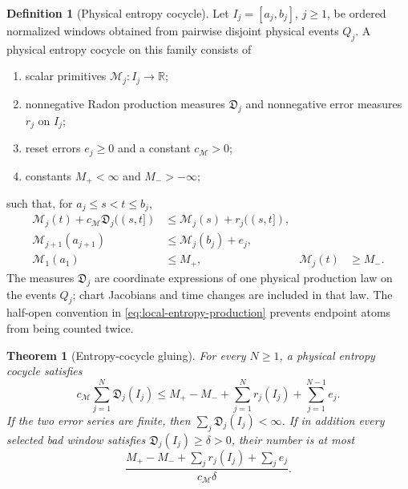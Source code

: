 \documentclass[11pt]{article}
\numberwithin{section}{part}
\theoremstyle{plain}
\newtheorem{theorem}{Theorem}[section]
\theoremstyle{definition}
\newtheorem{definition}[definition]{Definition}
\theoremstyle{remark}
\newcommand{\Production}{\mathfrak D}
\newcommand{\Entropy}{\mathcal M}
\begin{document}
\begin{definition}[Physical entropy cocycle]
\label{def:physical-entropy-cocycle}
Let \(I_j=[a_j,b_j]\), \(j\ge1\), be ordered normalized windows obtained from
pairwise disjoint physical events \(Q_j\).  A physical entropy cocycle on
this family consists of
\begin{enumerate}[label=\textup{(E\arabic*)}]
\item scalar primitives \(\Entropy_j:I_j\to\mathbb R\);
\item nonnegative Radon production measures \(\Production_j\) and
  nonnegative error measures \(r_j\) on \(I_j\);
\item reset errors \(e_j\ge0\) and a constant \(c_{\Entropy}>0\);
\item constants \(M_+<\infty\) and \(M_->-\infty\);
\end{enumerate}
such that, for \(a_j\le s<t\le b_j\),
\begin{align}
 \Entropy_j(t)+c_{\Entropy}\Production_j((s,t])
 &\le \Entropy_j(s)+r_j((s,t]),
 \label{eq:local-entropy-production}\\
 \Entropy_{j+1}(a_{j+1})
 &\le \Entropy_j(b_j)+e_j,
 \label{eq:entropy-reset-comparison}\\
 \Entropy_1(a_1)&\le M_+,
 &\Entropy_j(t)&\ge M_-.
 \label{eq:entropy-two-sided-bound}
\end{align}
The measures \(\Production_j\) are coordinate expressions of one physical
production law on the events \(Q_j\); chart Jacobians and time changes are
included in that law.  The half-open convention in
\eqref{eq:local-entropy-production} prevents endpoint atoms from being
counted twice.
\end{definition}

\begin{theorem}[Entropy-cocycle gluing]
\label{thm:entropy-cocycle-gluing}
For every \(N\ge1\), a physical entropy cocycle satisfies
\begin{equation}
 \label{eq:entropy-cocycle-bound}
 c_{\Entropy}\sum_{j=1}^{N}\Production_j(I_j)
 \le
 M_+-M_-
 +\sum_{j=1}^{N}r_j(I_j)
 +\sum_{j=1}^{N-1}e_j.
\end{equation}
If the two error series are finite, then
\(\sum_j\Production_j(I_j)<\infty\).  If in addition every selected bad
window satisfies \(\Production_j(I_j)\ge\delta>0\), their number is at most
\begin{equation}
 \label{eq:entropy-window-count}
 \frac{M_+-M_-+\sum_jr_j(I_j)+\sum_je_j}
      {c_{\Entropy}\delta}.
\end{equation}
\end{theorem}
\end{document}
